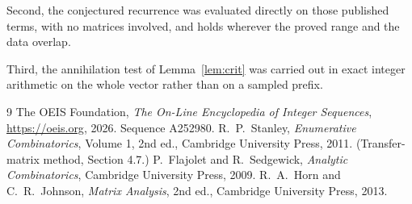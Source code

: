 \documentclass[11pt,a4paper]{article}
\theoremstyle{plain}
\theoremstyle{definition}
\begin{document}
Second, the conjectured recurrence was evaluated directly on those published terms, with no
matrices involved, and holds wherever the proved range and the data overlap.

Third, the annihilation test of Lemma~\ref{lem:crit} was carried out in exact integer
arithmetic on the whole vector rather than on a sampled prefix.

\begin{thebibliography}{9}
 The OEIS Foundation, \emph{The On-Line Encyclopedia of Integer
Sequences}, \url{https://oeis.org}, 2026. Sequence A252980.
 R.~P.~Stanley, \emph{Enumerative Combinatorics}, Volume 1, 2nd ed.,
Cambridge University Press, 2011. (Transfer-matrix method, Section 4.7.)
 P.~Flajolet and R.~Sedgewick, \emph{Analytic Combinatorics}, Cambridge
University Press, 2009.
 R.~A.~Horn and C.~R.~Johnson, \emph{Matrix Analysis}, 2nd ed., Cambridge
University Press, 2013.
\end{thebibliography}
\end{document}
